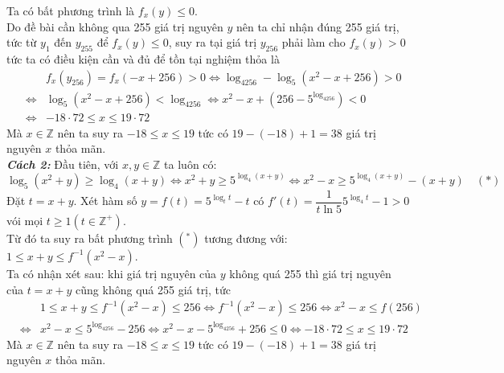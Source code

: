 \begin{ex}
{\begin{center}
		\end{center}
		Ta có bất phương trình là $f_x(y)\leq 0$.\\
		Do đề bài cần không qua 255 giá trị nguyên $y$ nên ta chỉ nhận đúng 255 giá trị, tức từ $y_1$ đến $y_{255}$ để $f_x(y)\leq 0$, suy ra tại giá trị $y_{256}$ phải làm cho $f_x(y)>0$ tức ta có điều kiện cần và đủ để tồn tại nghiệm thỏa là 
		\begin{eqnarray*}
			& &f_x(y_{256})=f_x(-x+256)>0\Leftrightarrow\log_4256-\log_5\left(x^2-x+256\right)>0\\
			&\Leftrightarrow & \log_5\left(x^2-x+256\right)<\log_4256\Leftrightarrow x^2-x+\left(256-5^{\log_4256}\right)<0\\
			&\Leftrightarrow &-18\cdot 72\leq x\leq 19\cdot 72
		\end{eqnarray*}		
		Mà $x\in\mathbb{Z}$ nên ta suy ra $-18\leq x\leq 19$ tức có $19-(-18)+1=38$ giá trị nguyên $x$ thỏa mãn.\\
		\textbf{\textit{Cách 2:}} Đầu tiên, với $x,y\in\mathbb{Z}$ ta luôn có:
		\[\log_5\left(x^2+y\right)\geq\log_4(x+y)\Leftrightarrow x^2+y\geq 5^{\log_4(x+y)}\Leftrightarrow x^2-x\geq 5^{\log_4(x+y)}-(x+y)\quad (*)\]
		Đặt $t=x+y$. Xét hàm số $y=f(t)=5^{\log_tt}-t$ có $f'(t)=\dfrac{1}{t\ln 5}5^{\log_4t}-1>0$ vói mọi $t\geq 1\left(t\in{\mathbb{Z}}^+\right)$.\\
		Từ đó ta suy ra bất phương trình $(^*)$ tương đương với: $1\leq x+y\leq f^{-1}\left(x^2-x\right)$.\\
		Ta có nhận xét sau: khi giá trị nguyên của $y$ không quá 255 thì giá trị nguyên của $t=x+y$ cũng không quá 255 giá trị, tức 
		\begin{eqnarray*}
			& &1\leq x+y\leq f^{-1}\left(x^2-x\right)\leq 256\Leftrightarrow f^{-1}\left(x^2-x\right)\leq 256\Leftrightarrow x^2-x\leq f(256)\\
			&\Leftrightarrow &x^2-x\leq 5^{\log_4256}-256\Leftrightarrow x^2-x-5^{\log_4256}+256\leq 0\Leftrightarrow-18\cdot 72\leq x\leq 19\cdot 72 
		\end{eqnarray*}		
		Mà $x\in\mathbb{Z}$ nên ta suy ra $-18\leq x\leq 19$ tức có $19-(-18)+1=38$ giá trị nguyên $x$ thỏa mãn.}
\end{ex}
